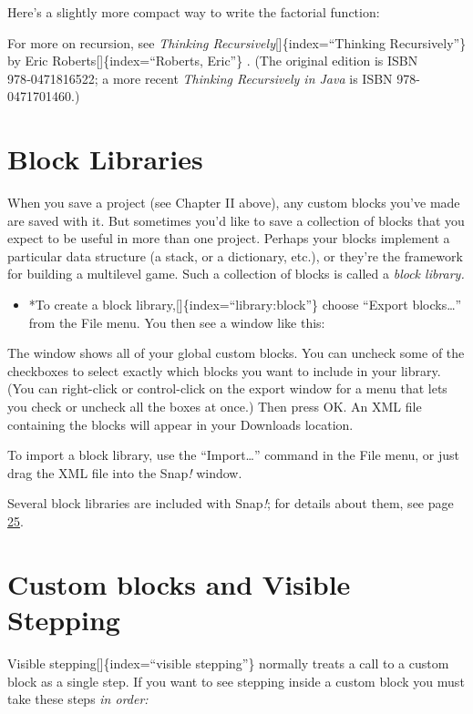 \documentclass[
  letterpaper,
]{book}
\providecommand{\tightlist}{%
  \setlength{\itemsep}{0pt}\setlength{\parskip}{0pt}}\usepackage{longtable,booktabs,array}
\begin{document}
Here's a slightly more compact way to write the factorial function:

For more on recursion, see \emph{Thinking
Recursively}{[}{]}\{index=``Thinking Recursively''\} by Eric
Roberts{[}{]}\{index=``Roberts, Eric''\} . (The original edition is ISBN
978‑0471816522; a more recent \emph{Thinking Recursively in Java} is
ISBN 978-0471701460.)

\section{Block Libraries}\label{block-libraries}

When you save a project (see Chapter II above), any custom blocks you've
made are saved with it. But sometimes you'd like to save a collection of
blocks that you expect to be useful in more than one project. Perhaps
your blocks implement a particular data structure (a stack, or a
dictionary, etc.), or they're the framework for building a multilevel
game. Such a collection of blocks is called a \emph{block library.}

\begin{itemize}
\tightlist
\item
  *To create a block library,{[}{]}\{index=``library:block''\} choose
  ``Export blocks\ldots{}'' from the File menu. You then see a window
  like this:
\end{itemize}

The window shows all of your global custom blocks. You can uncheck some
of the checkboxes to select exactly which blocks you want to include in
your library. (You can right-click or control-click on the export window
for a menu that lets you check or uncheck all the boxes at once.) Then
press OK. An XML file containing the blocks will appear in your
Downloads location.

To import a block library, use the ``Import\ldots{}'' command in the
File menu, or just drag the XML file into the Snap\emph{!} window.

Several block libraries are included with Snap\emph{!}; for details
about them, see page \hyperref[libraries-1]{25}.

\section{Custom blocks and Visible
Stepping}\label{custom-blocks-and-visible-stepping}

Visible stepping{[}{]}\{index=``visible stepping''\} normally treats a
call to a custom block as a single step. If you want to see stepping
inside a custom block you must take these steps \emph{in order:}
\end{document}
